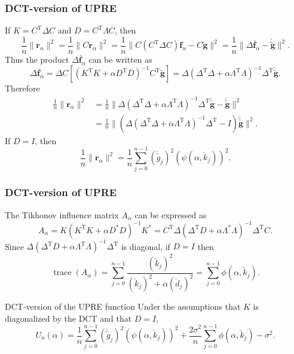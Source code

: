 \documentclass[t]{beamer}
\newcommand{\noiseSD}{\sigma}	%
\newcommand{\gnoise}{\widetilde{g}}	%
\newcommand{\gnoiseVec}{\widetilde{\mathbf{g}}}	%
\newcommand{\fVec}{\mathbf{f}}	%
\newcommand{\trans}{\mathrm{T}}	%
\newcommand{\ctrans}{*}	%
\DeclareMathOperator{\trace}{trace}		%
\newcommand{\dct}[1]{\breve{#1}}	%
\newcommand{\regparam}{\alpha}
\newcommand{\regf}{\fVec_{\regparam}}	%
\newcommand{\filt}{\phi}
\newcommand{\mfilt}{\psi}
\newcommand{\regres}{\mathbf{r}_{\regparam}}	%
\newcommand{\A}{A_{\regparam}}	%
\newcommand{\U}{U}	%
\begin{document}
\begin{frame}
\frametitle{DCT-version of UPRE}
If $K = C^\trans\Delta{C}$ and $D = C^\trans\Lambda{C}$, then
\[\frac{1}{n}\|\regres\|^2 = \frac{1}{n}\|C\regres\|^2 = \frac{1}{n}\|C(C^\trans\Delta{C})\regf - C\gnoiseVec\|^2 = \frac{1}{n}\|\Delta\dct{\regf} - \dct{\gnoiseVec}\|^2.\]
Thus the product $\Delta\dct{\regf}$ can be written as
\[\Delta\dct{\regf} = \Delta{C}[(K^\trans{K} + \regparam{D^\trans}D)^{-1}C^\trans\gnoiseVec] = \Delta(\Delta^\trans{\Delta} + \regparam\Lambda^\trans{\Lambda})^{-1}\Delta^\trans\dct{\gnoiseVec}.\]
Therefore
\begin{align*}
\frac{1}{n}\|\regres\|^2 &= \frac{1}{n}\|\Delta(\Delta^\trans{\Delta} + \regparam\Lambda^\trans{\Lambda})^{-1}\Delta^\trans\dct{\gnoiseVec} - \dct{\gnoiseVec}\|^2 \\
&= \frac{1}{n}\|(\Delta(\Delta^\trans{\Delta} + \regparam\Lambda^\trans{\Lambda})^{-1}\Delta^\trans - I)\dct{\gnoiseVec}\|^2.
\end{align*}
If $D = I$, then
\[\frac{1}{n}\|\regres\|^2 = \frac{1}{n}\sum_{j=0}^{n-1}(\dct{\gnoise}_j)^2\left(\mfilt(\regparam,\dct{k}_j)\right)^2.\]
\end{frame}

\begin{frame}
\frametitle{DCT-version of UPRE}
The Tikhonov influence matrix $\A$ can be expressed as
\[\A = K(K^\trans{K} + \regparam{D^\ctrans}D)^{-1}K^\ctrans = C^\trans\Delta(\Delta^\trans{D} + \regparam\Lambda^\ctrans{\Lambda})^{-1}\Delta^\trans{C}.\]
Since $\Delta(\Delta^\trans{D} + \regparam\Lambda^\trans{\Lambda})^{-1}\Delta^\trans$ is diagonal, if $D = I$ then
\[\trace(\A) = \sum_{j = 0}^{n-1} \frac{(\dct{k}_j)^2}{(\dct{k}_j)^2 + \regparam(\dct{d}_j)^2} = \sum_{j = 0}^{n-1} \filt(\regparam,\dct{k}_j).\]
\begin{block}{DCT-version of the UPRE function}
Under the assumptions that $K$ is diagonalized by the DCT and that $D = I$,
\[\U_n(\regparam) = \frac{1}{n}\sum_{j = 0}^{n-1} (\dct{\gnoise}_j)^2(\mfilt(\regparam,\dct{k}_j))^2 + \frac{2\noiseSD^2}{n}\sum_{j = 0}^{n-1} \filt(\regparam,\dct{k}_j) - \noiseSD^2.\]
\end{block}
\end{frame}
\end{document}
